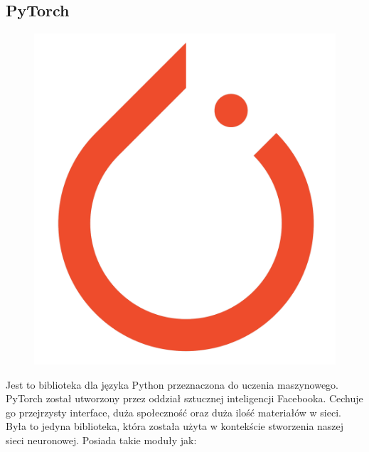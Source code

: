 \subsection{PyTorch}
\begin{figure}
\vspace{-4mm}
\includegraphics[width=\linewidth]{./images/pytorch.png} 
\vspace{-4mm}
\end{figure}
Jest to biblioteka dla języka Python przeznaczona do uczenia maszynowego. PyTorch został utworzony
przez oddział sztucznej inteligencji Facebooka. Cechuje go przejrzysty interface, duża społeczność
oraz duża ilość materiałów w sieci. Była to jedyna biblioteka, która została użyta w kontekście 
stworzenia naszej sieci neuronowej. Posiada takie moduły jak: 
\newline
\newline
{}


